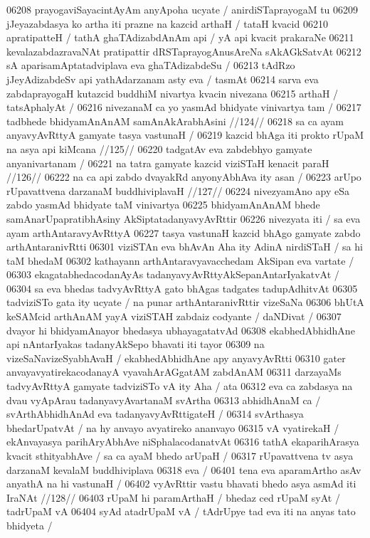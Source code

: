 06208 prayogaviSayacintAyAm anyApoha ucyate / anirdiSTaprayogaM tu  
06209 jJeyazabdasya ko artha iti prazne na kazcid arthaH / tataH kvacid  
06210 apratipatteH / tathA ghaTAdizabdAnAm api / yA api kvacit prakaraNe
06211 kevalazabdazravaNAt pratipattir dRSTaprayogAnusAreNa sAkAGkSatvAt
06212 sA aparisamAptatadviplava eva ghaTAdizabdeSu /  
06213 tAdRzo jJeyAdizabdeSv api yathAdarzanam asty eva / tasmAt
06214 sarva eva zabdaprayogaH kutazcid buddhiM nivartya kvacin nivezana 
06215 arthaH / tatsAphalyAt /
06216 	nivezanaM ca yo yasmAd bhidyate vinivartya tam /  
06217 	tadbhede bhidyamAnAnAM samAnAkArabhAsini //124// 
06218 	sa ca ayam anyavyAvRttyA gamyate tasya vastunaH /
06219 	kazcid bhAga iti prokto rUpaM na asya api kiMcana //125//  
06220 	tadgatAv eva zabdebhyo gamyate anyanivartanam / 
06221 	na tatra gamyate kazcid viziSTaH kenacit paraH //126//
06222 	na ca api zabdo dvayakRd anyonyAbhAva ity asan /  
06223 	arUpo rUpavattvena darzanaM buddhiviplavaH //127// 
06224 nivezyamAno apy eSa zabdo yasmAd bhidyate taM vinivartya 
06225 bhidyamAnAnAM bhede samAnarUpapratibhAsiny AkSiptatadanyavyAvRttir
06226 nivezyata iti / sa eva ayam arthAntaravyAvRttyA 
06227 tasya vastunaH kazcid bhAgo gamyate zabdo arthAntaranivRtti 
06301 viziSTAn eva bhAvAn Aha ity AdinA nirdiSTaH /  sa hi taM bhedaM  
06302 kathayann arthAntaravyavacchedam AkSipan eva vartate / 
06303 ekagatabhedacodanAyAs tadanyavyAvRttyAkSepanAntarIyakatvAt / 
06304 sa eva bhedas tadvyAvRttyA gato bhAgas tadgates tadupAdhitvAt  
06305 tadviziSTo gata ity ucyate / na punar arthAntaranivRttir vizeSaNa 
06306 bhUtA keSAMcid arthAnAM yayA viziSTAH zabdaiz codyante / daNDivat /
06307 dvayor hi bhidyamAnayor bhedasya ubhayagatatvAd
06308 ekabhedAbhidhAne api nAntarIyakas tadanyAkSepo bhavati iti tayor
06309 na vizeSaNavizeSyabhAvaH / ekabhedAbhidhAne apy anyavyAvRtti 
06310 gater anvayavyatirekacodanayA vyavahArAGgatAM zabdAnAM  
06311 darzayaMs tadvyAvRttyA gamyate tadviziSTo vA ity Aha / ata 
06312 eva ca zabdasya na dvau vyApArau tadanyavyAvartanaM svArtha
06313 abhidhAnaM ca / svArthAbhidhAnAd eva tadanyavyAvRttigateH /
06314 svArthasya bhedarUpatvAt / na hy anvayo avyatireko ananvayo  
06315 vA vyatirekaH / ekAnvayasya parihAryAbhAve niSphalacodanatvAt 
06316 tathA ekaparihArasya kvacit sthityabhAve / sa ca ayaM bhedo arUpaH /
06317 rUpavattvena tv asya darzanaM kevalaM buddhiviplava
06318 eva /
06401 	tena eva aparamArtho asAv anyathA na hi vastunaH / 
06402 	vyAvRttir vastu bhavati bhedo asya asmAd iti IraNAt //128//
06403 rUpaM hi paramArthaH / bhedaz ced rUpaM syAt / tadrUpaM vA
06404 syAd atadrUpaM vA / tAdrUpye tad eva iti na anyas tato bhidyeta /
